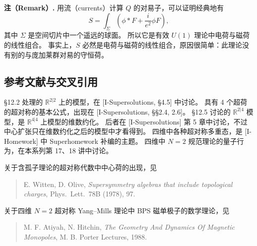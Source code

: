 \textbf{注（Remark）.} 用流（currents）计算 $Q$ 的对易子，可以证明经典地有
\begin{equation}
  \tag{12.27}
  \label{eq:12-27}
  S=\int_\Sigma\left(\phi*F+\frac{i}{e^2}\phi F\right),
\end{equation}
其中 $\Sigma$ 是空间切片中一个遥远的球面。
所以它是有效 $U(1)$ 理论中电荷与磁荷的线性组合。
事实上，$S$ 必然是电荷与磁荷的线性组合，原因很简单：此理论没有别的与庞加莱群对易的守恒荷。


\subsection*{参考文献与交叉引用}

§12.2 处理的 $\mathbb{R}^{2|2}$ 上的模型，在 [I-Supersolutions, §4.5] 中讨论。
具有 4 个超荷的超对称的基本公式，出现在 [I-Supersolutions, §§2.4, 2.6]。
§12.5 讨论的 $\mathbb{R}^{2|4}$ 模型，是 $\mathbb{R}^{4|4}$ 上模型的维数约化。
后者在 [I-Supersolutions] 第 5 章中讨论，不过中心扩张只在维数约化之后的模型中才看得到。
四维中各种超对称多重态，是 [I-Homework] 中 Superhomework 补编的主题。
四维中 $N=2$ 规范理论的量子行为，在本系列第 17、18 讲中讨论。

关于含孤子理论的超对称代数中中心荷的出现，见
\begin{quote}
\noindent E. Witten, D. Olive, \emph{Supersymmetry algebras that include topological charges}, Phys.\ Lett.\ 78B (1978), 97.
\end{quote}

关于四维 $N=2$ 超对称 Yang--Mills 理论中 BPS 磁单极子的数学理论，见
\begin{quote}
\noindent M. F. Atiyah, N. Hitchin, \emph{The Geometry And Dynamics Of Magnetic Monopoles}, M. B. Porter Lectures, 1988.
\end{quote}

